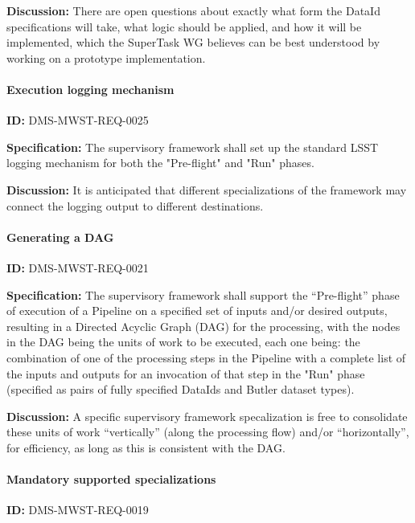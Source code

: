 \documentclass[SE,toc,lsstdraft]{lsstdoc}
\begin{document}
\textbf{Discussion:}
There are open questions about exactly what form the DataId specifications will take, what logic should be applied, and how it will be implemented, which the SuperTask WG believes can be best understood by working on a prototype implementation.

\paragraph{Execution logging mechanism}\hfill  %

\label{DMS-MWST-REQ-0025}
\textbf{ID:} DMS-MWST-REQ-0025

\textbf{Specification:}
The supervisory framework shall set up the standard LSST logging mechanism for both the "Pre-flight" and "Run" phases.

\textbf{Discussion:}
It is anticipated that different specializations of the framework may connect the logging output to different destinations.

\paragraph{Generating a DAG}\hfill  %

\label{DMS-MWST-REQ-0021}
\textbf{ID:} DMS-MWST-REQ-0021

\textbf{Specification:}
The supervisory framework shall support the “Pre-flight” phase of execution of a Pipeline on a specified set of inputs and/or desired outputs, resulting in a Directed Acyclic Graph (DAG) for the processing, with the nodes in the DAG being the units of work to be executed, each one being: the combination of one of the processing steps in the Pipeline with a complete list of the inputs and outputs for an invocation of that step in the "Run" phase (specified as pairs of fully specified DataIds and Butler dataset types).

\textbf{Discussion:}
A specific supervisory framework specalization is free to consolidate these units of work “vertically” (along the processing flow) and/or “horizontally”, for efficiency, as long as this is consistent with the DAG.

\paragraph{Mandatory supported specializations}\hfill  %

\label{DMS-MWST-REQ-0019}
\textbf{ID:} DMS-MWST-REQ-0019
\end{document}
